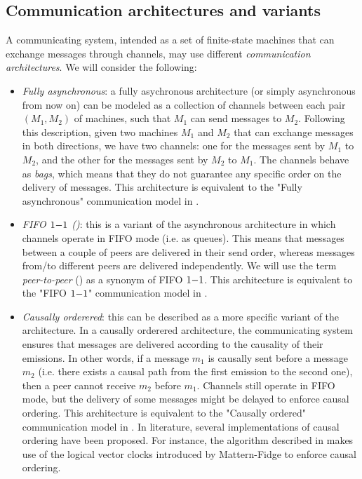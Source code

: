 \documentclass{article}
\begin{document}

\subsection{Communication architectures and variants}

A communicating system, intended as a set of finite-state machines that can exchange messages through channels, may use different \emph{communication architectures}. We will consider the following:
\begin{itemize}
	\item \emph{Fully asynchronous}: a fully asychronous architecture (or simply asynchronous from now on) can be modeled as a collection of channels between each pair $(M_1,M_2)$ of machines, such that $M_1$ can send messages to $M_2$. Following this description, given two machines $M_1$ and $M_2$ that can exchange messages in both directions, we have two channels: one for the messages sent by $M_1$ to $M_2$, and the other for the messages sent by $M_2$ to $M_1$. The channels behave as \emph{bags}, which means that they do not guarantee any specific order on the delivery of messages. This architecture is equivalent to the "Fully asynchronous" communication model in \cite{DBLP:journals/fac/ChevrouHQ16}.
	\item \emph{FIFO $1\mathsf{-}1$ (\pp)}: this is a variant of the asynchronous architecture in which channels operate in FIFO mode (i.e. as queues). This means that messages between a couple of peers are delivered in their send order, whereas messages from/to different peers are delivered independently. We will use the term \emph{peer-to-peer} (\pp) as a synonym of FIFO $1\mathsf{-}1$. This architecture is equivalent to the "FIFO $1\mathsf{-}1$" communication model in \cite{DBLP:journals/fac/ChevrouHQ16}.
	\item \emph{Causally orderered}: this can be described as a more specific variant of the \pp architecture. In a causally orderered architecture, the communicating system ensures that messages are delivered according to the causality of their emissions. In other words, if a message $m_1$ is causally sent before a message $m_2$ (i.e. there exists a causal path from the first emission to the second one), then a peer cannot receive $m_2$ before $m_1$. Channels still operate in FIFO mode, but the delivery of some messages might be delayed to enforce causal ordering. This architecture is equivalent to the "Causally ordered" communication model in \cite{DBLP:journals/fac/ChevrouHQ16}. In literature, several implementations of causal ordering have been proposed. For instance, the algorithm described in \cite{DBLP:conf/wdag/SchiperES89} makes use of the logical vector clocks introduced by Mattern-Fidge \cite{Fidge88timestampsin, Mattern89virtualtime} to enforce causal ordering.

\end{itemize}
\end{document}
